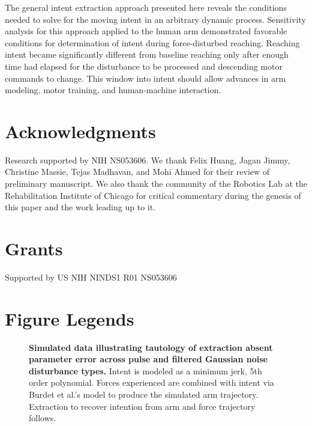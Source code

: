 \documentclass[10pt]{article}
\begin{document}
The general intent extraction approach presented here reveals the conditions needed to solve for the moving intent in an arbitrary dynamic process. Sensitivity analysis for this approach applied to the human arm demonstrated favorable conditions for determination of intent during force-disturbed reaching. Reaching intent became significantly different from baseline reaching only after enough time had elapsed for the disturbance to be processed and descending motor commands to change. This window into intent should allow advances in arm modeling, motor training, and human-machine interaction.

\section*{Acknowledgments}
Research supported by NIH NS053606.  We thank Felix Huang, Jagan Jimmy, Christine Massie, Tejas Madhavan, and Mohi Ahmed for their review of preliminary manuscript. We also thank the community  of the Robotics Lab at the Rehabilitation Institute of Chicago for critical commentary during the genesis of this paper and the work leading up to it.
 
\section*{Grants} 
Supported by US NIH NINDS1 R01 NS053606



\section*{Figure Legends}

\begin{figure}[!ht]
\begin{center}
\end{center}
\caption{
{\bf Simulated data illustrating tautology of extraction absent parameter error across pulse and filtered Gaussian noise disturbance types.} Intent is modeled as a minimum jerk, 5th order polynomial. Forces experienced are combined with intent via Burdet et al.'s \cite{burdet2006stability} model to produce the simulated arm trajectory. Extraction to recover intention from arm and force trajectory follows.
}
\label{fig:synthetic}
\end{figure}
\end{document}
